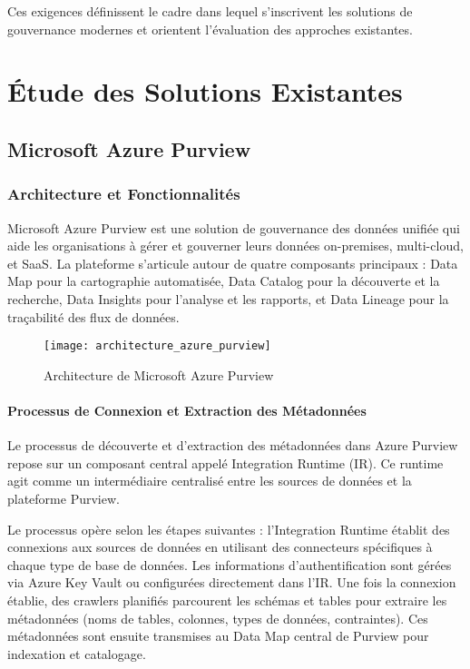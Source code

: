 Ces exigences définissent le cadre dans lequel s'inscrivent les solutions de gouvernance modernes et orientent l'évaluation des approches existantes.

\section{Étude des Solutions Existantes}

\subsection{Microsoft Azure Purview}

\subsubsection{Architecture et Fonctionnalités}

Microsoft Azure Purview est une solution de gouvernance des données unifiée qui aide les organisations à gérer et gouverner leurs données on-premises, multi-cloud, et SaaS. La plateforme s'articule autour de quatre composants principaux : Data Map pour la cartographie automatisée, Data Catalog pour la découverte et la recherche, Data Insights pour l'analyse et les rapports, et Data Lineage pour la traçabilité des flux de données.

\begin{figure}[htpb]
\centering
\texttt{[image: architecture\_azure\_purview]}
\caption{Architecture de Microsoft Azure Purview}
\label{fig:architecture_purview}
\end{figure}

\paragraph{Processus de Connexion et Extraction des Métadonnées}

Le processus de découverte et d'extraction des métadonnées dans Azure Purview repose sur un composant central appelé Integration Runtime (IR). Ce runtime agit comme un intermédiaire centralisé entre les sources de données et la plateforme Purview.

Le processus opère selon les étapes suivantes : l'Integration Runtime établit des connexions aux sources de données en utilisant des connecteurs spécifiques à chaque type de base de données. Les informations d'authentification sont gérées via Azure Key Vault ou configurées directement dans l'IR. Une fois la connexion établie, des crawlers planifiés parcourent les schémas et tables pour extraire les métadonnées (noms de tables, colonnes, types de données, contraintes). Ces métadonnées sont ensuite transmises au Data Map central de Purview pour indexation et catalogage.

